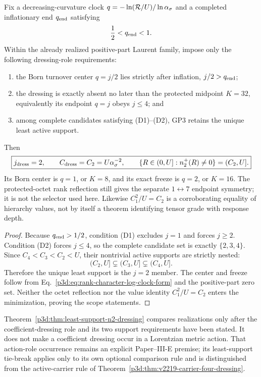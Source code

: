 \documentclass[12pt,a4paper]{article}
\begin{document}
\begin{theorem}
\label{p3d:thm:least-support-n2-dressing}
Fix a decreasing-curvature clock
\(q=-\ln(\mathcal R/U)/\ln\alpha_\sigma\) and a completed inflationary end
\(q_{\rm end}\) satisfying
\[
 \frac12<q_{\rm end}<1.
\]
Within the already realized positive-part Laurent family, impose only the
following dressing-role requirements:
\begin{enumerate}[label=\textup{(D\arabic*)}]
\item the Born turnover center \(q=j/2\) lies strictly after inflation,
      \(j/2>q_{\rm end}\);
\item the dressing is exactly absent no later than the protected midpoint
      \(K=32\), equivalently its endpoint \(q=j\) obeys \(j\le4\); and
\item among complete candidates satisfying \textup{(D1)--(D2)}, GP3 retains
      the unique least active support.
\end{enumerate}
Then
\begin{equation}
\label{p3d:eq:least-support-n2-selection}
 \boxed{j_{\rm dress}=2,\qquad
        C_{\rm dress}=C_2=U\alpha_\sigma^{-2},\qquad
        \{R\in(0,U]:n_2^+(R)\ne0\}=(C_2,U].}
\end{equation}
Its Born center is \(q=1\), or \(K=8\), and its exact freeze is \(q=2\),
or \(K=16\).  The protected-octet rank reflection still gives the separate
\(1\leftrightarrow7\) endpoint symmetry; it is not the selector used here.
Likewise \(C_1^2/U=C_2\) is a corroborating equality of hierarchy values, not
by itself a theorem identifying tensor grade with response depth.
\end{theorem}

\begin{proof}
Because \(q_{\rm end}>1/2\), condition \textup{(D1)} excludes \(j=1\) and
forces \(j\ge2\).  Condition \textup{(D2)} forces \(j\le4\), so the complete
candidate set is exactly \(\{2,3,4\}\).  Since
\(C_4<C_3<C_2<U\), their nontrivial active supports are strictly nested:
\[
 (C_2,U]\subsetneq(C_3,U]\subsetneq(C_4,U].
\]
Therefore the unique least support is the \(j=2\) member.  The center and
freeze follow from Eq.~\eqref{p3d:eq:rank-character-log-clock-form} and the
positive-part zero set.  Neither the octet reflection nor the value identity
\(C_1^2/U=C_2\) enters the minimization, proving the scope statements.
\end{proof}

\begin{remark}
Theorem~\ref{p3d:thm:least-support-n2-dressing} compares realizations only
after the coefficient-dressing role and its two support requirements have
been stated.  It does not make a coefficient dressing occur in a Lorentzian
metric action.  That action-role occurrence remains an explicit Paper--III-E
premise; its least-support tie-break applies only to its own
optional comparison rule and is distinguished from the active-carrier rule of
Theorem~\ref{p3d:thm:v2219-carrier-four-dressing}.
\end{remark}
\end{document}
